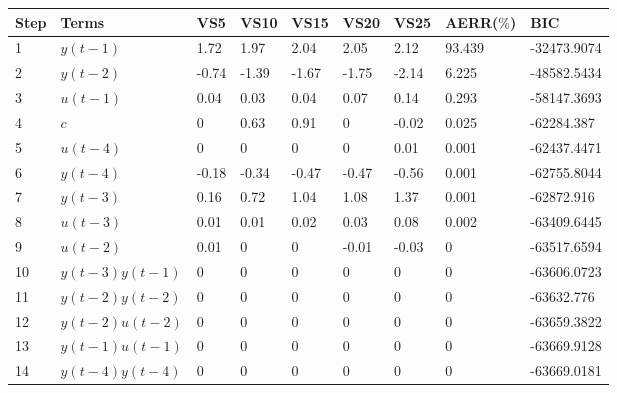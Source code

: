\begin{tabular}{lllllllll}
Step & Terms & VS5 & VS10 & VS15 & VS20 & VS25 & AERR($\%$) & BIC \\ 
\hline 
1 & $y(t-1)$ & 1.72 & 1.97 & 2.04 & 2.05 & 2.12 & 93.439 & -32473.9074 \\ 
2 & $y(t-2)$ & -0.74 & -1.39 & -1.67 & -1.75 & -2.14 & 6.225 & -48582.5434 \\ 
3 & $u(t-1)$ & 0.04 & 0.03 & 0.04 & 0.07 & 0.14 & 0.293 & -58147.3693 \\ 
4 & $c$ & 0 & 0.63 & 0.91 & 0 & -0.02 & 0.025 & -62284.387 \\ 
5 & $u(t-4)$ & 0 & 0 & 0 & 0 & 0.01 & 0.001 & -62437.4471 \\ 
6 & $y(t-4)$ & -0.18 & -0.34 & -0.47 & -0.47 & -0.56 & 0.001 & -62755.8044 \\ 
7 & $y(t-3)$ & 0.16 & 0.72 & 1.04 & 1.08 & 1.37 & 0.001 & -62872.916 \\ 
8 & $u(t-3)$ & 0.01 & 0.01 & 0.02 & 0.03 & 0.08 & 0.002 & -63409.6445 \\ 
9 & $u(t-2)$ & 0.01 & 0 & 0 & -0.01 & -0.03 & 0 & -63517.6594 \\ 
10 & $y(t-3)y(t-1)$ & 0 & 0 & 0 & 0 & 0 & 0 & -63606.0723 \\ 
11 & $y(t-2)y(t-2)$ & 0 & 0 & 0 & 0 & 0 & 0 & -63632.776 \\ 
12 & $y(t-2)u(t-2)$ & 0 & 0 & 0 & 0 & 0 & 0 & -63659.3822 \\ 
13 & $y(t-1)u(t-1)$ & 0 & 0 & 0 & 0 & 0 & 0 & -63669.9128 \\ 
14 & $y(t-4)y(t-4)$ & 0 & 0 & 0 & 0 & 0 & 0 & -63669.0181 \\ 
\hline 
\end{tabular}